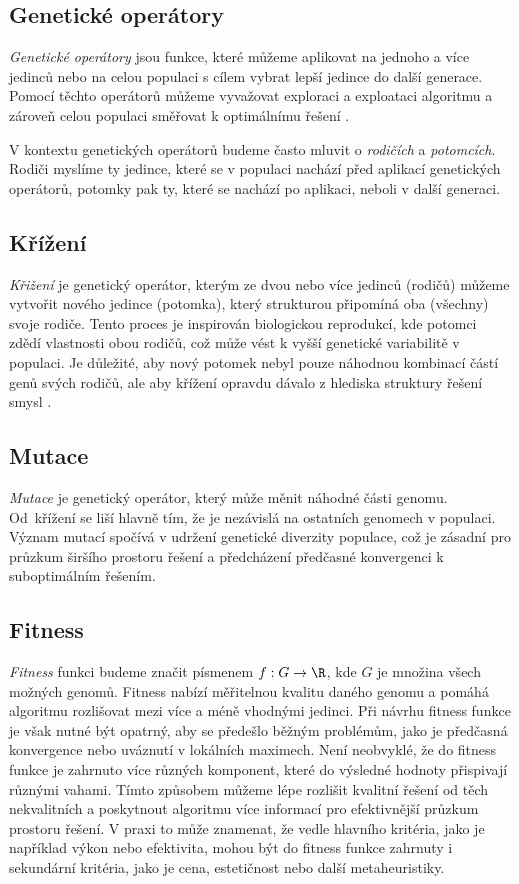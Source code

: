 \subsection{Genetické operátory}
\emph{Genetické operátory} jsou funkce, které můžeme aplikovat na jednoho a více jedinců nebo na celou populaci s cílem vybrat lepší jedince do další generace. Pomocí těchto operátorů můžeme vyvažovat exploraci a exploataci algoritmu a zároveň celou populaci směřovat k optimálnímu řešení \cite{EibenSmith2015}.

V kontextu genetických operátorů budeme často mluvit o \emph{rodičích} a \emph{potomcích}. Rodiči myslíme ty jedince, které se v populaci nachází před aplikací genetických operátorů, potomky pak ty, které se nachází po aplikaci, neboli v další generaci. 

\subsection{Křížení}
\emph{Křižení} je genetický operátor, kterým ze dvou nebo více jedinců (rodičů) můžeme vytvořit nového jedince (potomka), který strukturou připomíná oba (všechny) svoje rodiče. Tento proces je inspirován biologickou reprodukcí, kde potomci zdědí vlastnosti obou rodičů, což může vést k vyšší genetické variabilitě v populaci. Je důležité, aby nový potomek nebyl pouze náhodnou kombinací částí genů svých rodičů, ale aby křížení opravdu dávalo z hlediska struktury řešení smysl \cite{Jones1995Crossover}.

\subsection{Mutace}
\emph{Mutace} je genetický operátor, který může měnit náhodné části genomu. Od~křížení se liší hlavně tím, že je nezávislá na ostatních genomech v populaci. Význam mutací spočívá v udržení genetické diverzity populace, což je zásadní pro průzkum širšího prostoru řešení a předcházení předčasné konvergenci k suboptimálním řešením.

\subsection{Fitness}
\emph{Fitness} funkci budeme značit písmenem $f: G \rightarrow \R$, kde $G$ je množina všech možných genomů. Fitness nabízí měřitelnou kvalitu daného genomu a pomáhá algoritmu rozlišovat mezi více a méně vhodnými jedinci. Při návrhu fitness funkce je však nutné být opatrný, aby se předešlo běžným problémům, jako je předčasná konvergence nebo uváznutí v lokálních maximech. Není neobvyklé, že do fitness funkce je zahrnuto více různých komponent, které do výsledné hodnoty přispivají různými vahami. Tímto způsobem můžeme lépe rozlišit kvalitní řešení od těch nekvalitních a poskytnout algoritmu více informací pro efektivnější průzkum prostoru řešení. V praxi to může znamenat, že vedle hlavního kritéria, jako je například výkon nebo efektivita, mohou být do fitness funkce zahrnuty i sekundární kritéria, jako je cena, estetičnost nebo další metaheuristiky.

